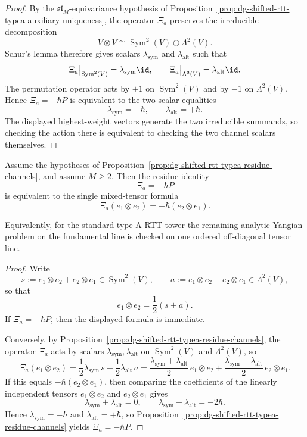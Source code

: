 \begin{proof}
By the $\mathfrak{sl}_M$-equivariance hypothesis of
Proposition~\ref{prop:dg-shifted-rtt-typea-auxiliary-uniqueness}, the
operator $\Xi_a$ preserves the irreducible decomposition
\[
V\otimes V \cong \operatorname{Sym}^2(V)\oplus \Lambda^2(V).
\]
Schur's lemma therefore gives scalars $\lambda_{\mathrm{sym}}$ and
$\lambda_{\mathrm{alt}}$ such that
\[
\Xi_a\big|_{\operatorname{Sym}^2(V)}=\lambda_{\mathrm{sym}}\id,
\qquad
\Xi_a\big|_{\Lambda^2(V)}=\lambda_{\mathrm{alt}}\id.
\]
The permutation operator acts by $+1$ on $\operatorname{Sym}^2(V)$ and by $-1$ on
$\Lambda^2(V)$. Hence $\Xi_a=-\hbar P$ is equivalent to the two scalar
equalities
\[
\lambda_{\mathrm{sym}}=-\hbar,
\qquad
\lambda_{\mathrm{alt}}=+\hbar.
\]
The displayed highest-weight vectors generate the two irreducible
summands, so checking the action there is equivalent to checking the two
channel scalars themselves.
\end{proof}

\begin{corollary}
\label{cor:dg-shifted-rtt-typea-single-line}
Assume the hypotheses of
Proposition~\ref{prop:dg-shifted-rtt-typea-residue-channels}, and
assume $M\ge 2$. Then the residue identity
\[
\Xi_a=-\hbar P
\]
is equivalent to the single mixed-tensor formula
\[
\Xi_a(e_1\otimes e_2)=-\hbar(e_2\otimes e_1).
\]

Equivalently, for the standard type-A RTT tower the remaining analytic
Yangian problem on the fundamental line is checked on one ordered
off-diagonal tensor line.
\end{corollary}

\begin{proof}
Write
\[
s:=e_1\otimes e_2+e_2\otimes e_1\in \operatorname{Sym}^2(V),
\qquad
a:=e_1\otimes e_2-e_2\otimes e_1\in \Lambda^2(V),
\]
so that
\[
e_1\otimes e_2=\frac{1}{2}(s+a).
\]
If $\Xi_a=-\hbar P$, then the displayed formula is immediate.

Conversely, by
Proposition~\ref{prop:dg-shifted-rtt-typea-residue-channels}, the
operator $\Xi_a$ acts by scalars
$\lambda_{\mathrm{sym}},\lambda_{\mathrm{alt}}$ on
$\operatorname{Sym}^2(V)$ and $\Lambda^2(V)$, so
\[
\Xi_a(e_1\otimes e_2)
=\frac{1}{2}\lambda_{\mathrm{sym}}\,s
+\frac{1}{2}\lambda_{\mathrm{alt}}\,a
=\frac{\lambda_{\mathrm{sym}}+\lambda_{\mathrm{alt}}}{2}\,
e_1\otimes e_2
+\frac{\lambda_{\mathrm{sym}}-\lambda_{\mathrm{alt}}}{2}\,
e_2\otimes e_1.
\]
If this equals $-\hbar(e_2\otimes e_1)$, then comparing the
coefficients of the linearly independent tensors
$e_1\otimes e_2$ and $e_2\otimes e_1$ gives
\[
\lambda_{\mathrm{sym}}+\lambda_{\mathrm{alt}}=0,
\qquad
\lambda_{\mathrm{sym}}-\lambda_{\mathrm{alt}}=-2\hbar.
\]
Hence $\lambda_{\mathrm{sym}}=-\hbar$ and
$\lambda_{\mathrm{alt}}=+\hbar$, so
Proposition~\ref{prop:dg-shifted-rtt-typea-residue-channels} yields
$\Xi_a=-\hbar P$.
\end{proof}

